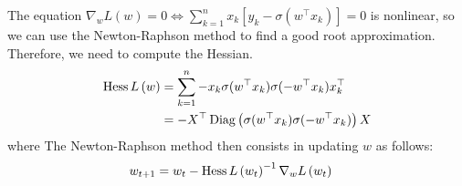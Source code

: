\documentclass[a4paper, 11pt]{article}
\begin{document}
    The equation $ \nabla_w L \left( w \right) = 0 \iff \sum_{k=1}^{n} x_k \left[y_k  - \sigma(w^\top x_k) \right] = 0$ is nonlinear, so we can use the Newton-Raphson method to find a good root approximation. Therefore, we need to compute the Hessian. 
    \begin{equation*}
        \begin{aligned}
        \operatorname{Hess} L \left( w \right) &= \sum_{k=1}^{n} -x_k \sigma(w^\top x_k) \sigma(-w^\top x_k)x_k^\top \\
        &= - X^\top \operatorname{Diag}\left(\sigma(w^\top x_k) \sigma(-w^\top x_k)\right)X \\
        \end{aligned}
    \end{equation*}
    where The Newton-Raphson method then consists in updating $w$ as follows:
    \begin{equation*}
        \begin{aligned}
        w_{t+1} &= w_t - \operatorname{Hess} L \left( w_t \right)^{-1} \nabla_w L \left(w_t\right) 
        \end{aligned}
    \end{equation*}
\end{document}
